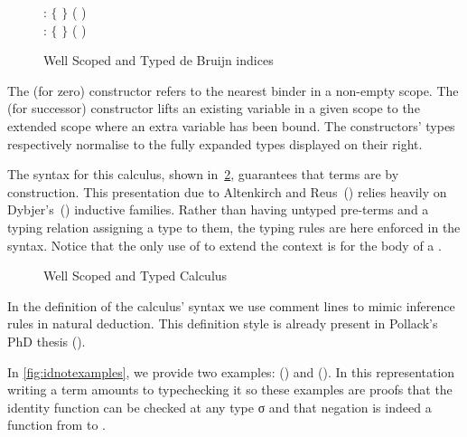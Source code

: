 \begin{figure}[h]
\begin{minipage}{0.5\textwidth}
\end{minipage}
\begin{minipage}{0.5\textwidth}
  \vspace*{\baselineskip}
   : { $\lbrace$ $\rbrace$ 
              ( \AIC{::} )}
  \\
   : { $\lbrace$  $\rbrace$ 
                  ( \AIC{::} )}
\end{minipage}
\caption{Well Scoped and Typed de Bruijn indices\label{fig:variable}}
\end{figure}

The  (for zero) constructor refers to the nearest binder in a
non-empty scope. The  (for successor) constructor lifts an
existing variable in a given scope to the extended scope where an
extra variable has been bound. The constructors' types respectively
normalise to the fully expanded types displayed on their right.

The syntax for this calculus, shown in~\cref{fig:term}, guarantees that
terms are \scopeandtypesafe{} by construction. This presentation due to
Altenkirch and Reus~(\citeyear{altenkirch1999monadic}) relies heavily on
Dybjer's~(\citeyear{dybjer1991inductive}) inductive families. Rather than
having untyped pre-terms and a typing relation assigning a type to
them, the typing rules are here enforced in the syntax. Notice that
the only use of  to extend the context is for the body of
a .

\begin{figure}[h]
\caption{Well Scoped and Typed Calculus\label{fig:term}}
\end{figure}

\begin{convention}
In the definition of the calculus' syntax we use comment lines to mimic
inference rules in natural deduction. This definition style is already
present in Pollack's PhD thesis (\citeyear{pollack1994}).
\end{convention}

In \cref{fig:idnotexamples}, we provide two examples: {()}
and {()}.
%
In this representation writing a term amounts to typechecking it so
these examples are proofs that the identity function can be checked
at any type σ and that negation is indeed a function from \bool{} to
\bool.

